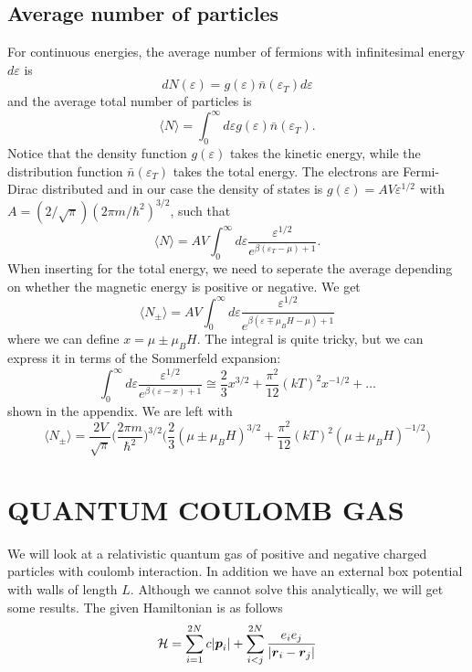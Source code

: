 \documentclass[norsk,a4paper,12pt]{article}
\begin{document}
\subsection{Average number of particles}
For continuous energies, the average number of fermions with infinitesimal energy $d\varepsilon$ is
\begin{equation}
dN(\varepsilon)=g(\varepsilon)\bar{n}(\varepsilon_T)d\varepsilon
\end{equation}
and the average total number of particles is 
\begin{equation}
\langle N\rangle=\int_0^{\infty}d\varepsilon g(\varepsilon)\bar{n}(\varepsilon_T).
\end{equation}
Notice that the density function $g(\varepsilon)$ takes the kinetic energy, while the distribution function $\bar{n}(\varepsilon_T)$ takes the total energy. The electrons are Fermi-Dirac distributed and in our case the density of states is
$g(\varepsilon)=AV\varepsilon^{1/2}$ with $A=(2/\sqrt{\pi})(2\pi m/\hbar^2)^{3/2}$, such that 
\begin{equation}
\langle N\rangle=AV\int_0^{\infty}d\varepsilon\frac{\varepsilon^{1/2}}{e^{\beta(\varepsilon_T-\mu)+1}}.
\end{equation}
When inserting for the total energy, we need to seperate the average depending on whether the magnetic energy is positive or negative. We get
\begin{equation}
\langle N_{\pm}\rangle=AV\int_0^{\infty}d\varepsilon\frac{\varepsilon^{1/2}}{e^{\beta(\varepsilon\mp\mu_BH-\mu)+1}}
\end{equation}
where we can define $x=\mu\pm\mu_BH$. The integral is quite tricky, but we can express it in terms of the Sommerfeld expansion:
\begin{equation}
\int_0^{\infty}d\varepsilon\frac{\varepsilon^{1/2}}{e^{\beta(\varepsilon-x)+1}}\cong\frac{2}{3}x^{3/2}+\frac{\pi^2}{12}(kT)^2x^{-1/2}+\hdots
\end{equation}
shown in the appendix. We are left with
\begin{equation}
\langle N_{\pm}\rangle=\frac{2V}{\sqrt{\pi}}\bigg(\frac{2\pi m}{\hbar^2}\bigg)^{3/2}\bigg(\frac{2}{3}(\mu\pm\mu_BH)^{3/2}+\frac{\pi^2}{12}(kT)^2(\mu\pm\mu_BH)^{-1/2}\bigg)
\end{equation}

\newpage
\section{QUANTUM COULOMB GAS}
We will look at a relativistic quantum gas of positive and negative charged particles with coulomb interaction. In addition we have an external box potential with walls of length $L$. Although we cannot solve this analytically, we will get some results. The given Hamiltonian is as follows
\begin{equation}
{\cal H}=\sum_{i=1}^{2N}c|\boldsymbol{p}_i|+\sum_{i<j}^{2N}\frac{e_ie_j}{|\boldsymbol{r}_i - \boldsymbol{r}_j|}
\end{equation}
\end{document}
